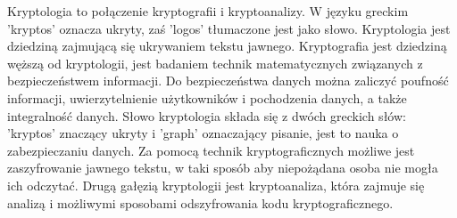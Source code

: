 \documentclass[12p]{article}
\begin{document}
\quad Kryptologia to połączenie kryptografii i kryptoanalizy. W języku greckim 'kryptos' oznacza ukryty, zaś 'logos' tłumaczone jest jako słowo. Kryptologia jest dziedziną zajmującą się ukrywaniem tekstu jawnego. Kryptografia jest dziedziną węższą od kryptologii, jest badaniem technik matematycznych związanych z bezpieczeństwem informacji. Do bezpieczeństwa danych można zaliczyć poufność informacji, uwierzytelnienie użytkowników i pochodzenia danych, a także integralność danych. Słowo kryptologia składa się z dwóch greckich słów: 'kryptos' znaczący ukryty i 'graph' oznaczający pisanie, jest to nauka o zabezpieczaniu danych. Za pomocą technik kryptograficznych możliwe jest zaszyfrowanie jawnego tekstu, w taki sposób aby niepożądana osoba nie mogła ich odczytać. Drugą gałęzią kryptologii jest kryptoanaliza, która zajmuje się analizą i możliwymi sposobami odszyfrowania kodu kryptograficznego.
\end{document}

